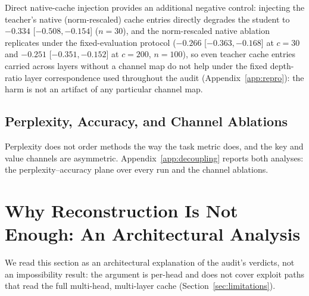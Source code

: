 \documentclass{article} %
\begin{document}
Direct native-cache injection provides an additional negative control:
injecting the teacher's native
(norm-rescaled) cache entries directly degrades the student to $-0.334$
[$-0.508, -0.154$] ($n{=}30$), and the norm-rescaled native ablation
replicates under the fixed-evaluation protocol ($-0.266$ [$-0.363, -0.168$]
at $c{=}30$ and $-0.251$ [$-0.351, -0.152$] at $c{=}200$, $n{=}100$), so
even teacher cache entries carried across layers without a channel map do not
help under the fixed depth-ratio layer correspondence used throughout the audit
(Appendix~\ref{app:repro}): the harm is not an artifact of any particular
channel map.

\subsection{Perplexity, Accuracy, and Channel Ablations}
Perplexity does not order methods the way the task metric does, and the key and
value channels are asymmetric. Appendix~\ref{app:decoupling} reports both
analyses: the perplexity--accuracy plane over every run and the channel
ablations.

\section{Why Reconstruction Is Not Enough: An Architectural Analysis}
\label{sec:why}

We read this section as an architectural explanation of the audit's
verdicts, not an impossibility result: the argument is per-head and
does not cover exploit paths that read the full multi-head,
multi-layer cache (Section~\ref{sec:limitations}).
\end{document}
